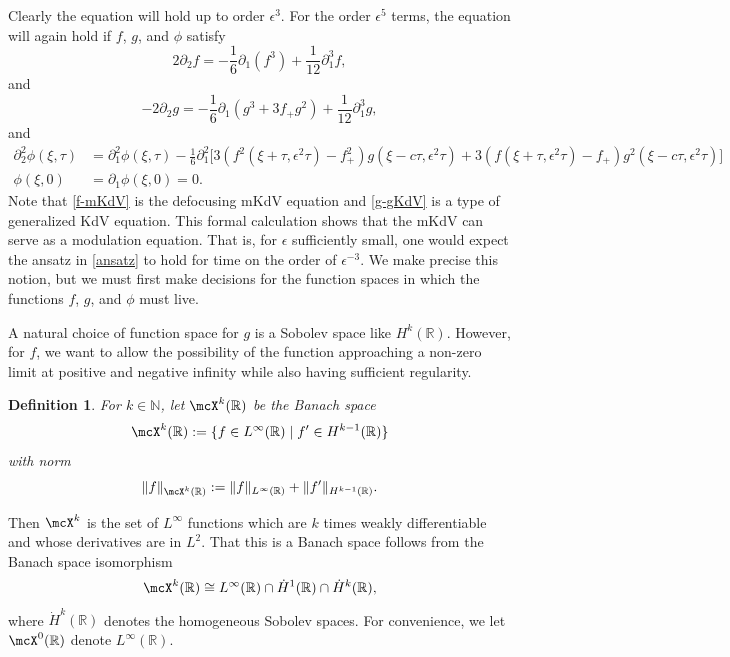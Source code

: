 \documentclass[oneside,reqno]{amsart}
\newcommand{\R}{\mathbb{R}}
\newcommand{\N}{\mathbb{N}}
\newtheorem{defn}{Definition}[section]
\begin{document}
Clearly the equation will hold up to order \(\epsilon^3\). For the order \(\epsilon^5\) terms, the equation will again hold if \(f\), \(g\), and \(\phi\) satisfy
\begin{equation}\label{f-mKdV}
	2 \partial_2 f = - \frac 1 6 \partial_1(f^3) + \frac 1 {12} \partial_1^3 f,
\end{equation}
and 
\begin{equation}\label{g-gKdV}
	-2 \partial_2 g = - \frac 1 6 \partial_1 (g^3 + 3f_+ g^2) + \frac 1 {12}\partial_1^3 g,
\end{equation}
and
\begin{equation}\label{phi-pde}
	\begin{aligned}
		\partial_2^2 \phi(\xi, \tau) &= \partial_1^2\phi(\xi, \tau)- \frac 1 6 \partial_1^2 \big[ 3(f^2(\xi+\tau,\epsilon^2\tau)-f_+^2)g(\xi-c\tau,\epsilon^2\tau) + 3 (f(\xi+\tau,\epsilon^2\tau)-f_+)g^2(\xi-c\tau,\epsilon^2\tau) \big ] \\
		\phi(\xi,0) &= \partial_1 \phi(\xi, 0) = 0.
	\end{aligned}
\end{equation}
Note that \cref{f-mKdV} is the defocusing mKdV equation and \cref{g-gKdV} is a type of generalized KdV equation. This formal calculation shows that the mKdV can serve as a modulation equation. That is, for \(\epsilon\) sufficiently small, one would expect the ansatz in \cref{ansatz} to hold for time on the order of \(\epsilon^{-3}\). We make precise this notion, but we must first make decisions for the function spaces in which the functions \(f\), \(g\), and \(\phi\) must live.

A natural choice of function space for \(g\) is a Sobolev space like \(H^k(\R)\). However, for \(f\), we want to allow the possibility of the function approaching a non-zero limit at positive and negative infinity while also having sufficient regularity. 
\begin{defn}
	For \(k\in\N\), let \(\mcX^k(\R)\) be the Banach space 
	\begin{equation*}
		\mcX^k(\R) := \{f \in L^\infty(\R) \mid f'\in H^{k-1}(\R)\}
	\end{equation*}
	with norm
	\begin{equation*}
		\| f \|_{\mcX^k(\R)} := \| f \|_{L^\infty(\R)} + \| f' \|_{H^{k-1}(\R)}.
	\end{equation*}
\end{defn}
Then \(\mcX^k\) is the set of \(L^\infty\) functions which are \(k\) times weakly differentiable and whose derivatives are in \(L^2\). That this is a Banach space follows from the Banach space isomorphism
\begin{equation*}
	\mcX^k(\R) \cong L^\infty(\R) \cap \dot H^1(\R) \cap \dot H^k(\R),
\end{equation*}
where \(\dot H^k(\R)\) denotes the homogeneous Sobolev spaces. For convenience, we let \(\mcX^0(\R)\) denote \(L^\infty(\R)\).
\end{document}
